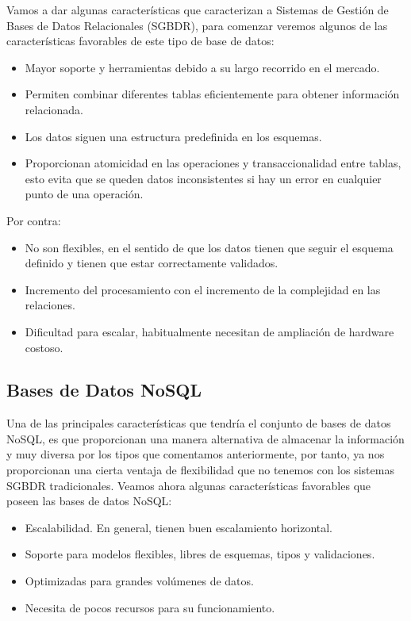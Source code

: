 Vamos a dar algunas características que caracterizan a Sistemas de Gestión de Bases de Datos Relacionales (SGBDR), para comenzar veremos algunos de las características favorables de este tipo de base de datos:

\begin{itemize}
    \item Mayor soporte y herramientas debido a su largo recorrido en el mercado.
    \item Permiten combinar diferentes tablas eficientemente para obtener información relacionada.
    \item Los datos siguen una estructura predefinida en los esquemas.
    \item Proporcionan atomicidad en las operaciones y transaccionalidad entre tablas, esto evita que se queden datos inconsistentes si hay un error en cualquier punto de una operación.
\end{itemize}

Por contra:

\begin{itemize}
    \item No son flexibles, en el sentido de que los datos tienen que seguir el esquema definido y tienen que estar correctamente validados.
    \item Incremento del procesamiento con el incremento de la complejidad en las relaciones.
    \item Dificultad para escalar, habitualmente necesitan de ampliación de hardware costoso.
\end{itemize}

\subsection{Bases de Datos NoSQL}

Una de las principales características que tendría el conjunto de bases de datos NoSQL, es que proporcionan una manera alternativa de almacenar la información y muy diversa por los tipos que comentamos anteriormente, por tanto, ya nos proporcionan una cierta ventaja de flexibilidad que no tenemos con los sistemas SGBDR tradicionales. Veamos ahora algunas características favorables que poseen las bases de datos NoSQL:

\begin{itemize}
    \item Escalabilidad. En general, tienen buen escalamiento horizontal.
    \item Soporte para modelos flexibles, libres de esquemas, tipos y validaciones.
    \item Optimizadas para grandes volúmenes de datos.
    \item Necesita de pocos recursos para su funcionamiento.
\end{itemize}


